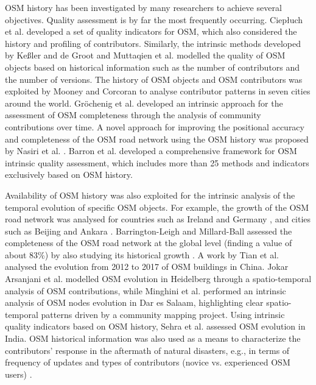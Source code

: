 \documentclass{Configuration_Files/PoliMi3i_thesis}
\begin{document}
OSM history has been investigated by many researchers to achieve several objectives. Quality assessment is by far the most frequently occurring. Ciepłuch et al. \cite{ciepluchBuildingGenericQuality2011} developed a set of quality indicators for OSM, which also considered the history and profiling of contributors. Similarly, the intrinsic methods developed by Keßler and de Groot \cite{kesslerTrustProxyMeasure2013} and Muttaqien et al. \cite{muttaqienModelingAggregatedExpertise2018} modelled the quality of OSM objects based on historical information such as the number of contributors and the number of versions. The history of OSM objects and OSM contributors was exploited by Mooney and Corcoran \cite{mooneyAnalysisInteractionCoediting2014} to analyse contributor patterns in seven cities around the world. Gröchenig et al. \cite{grochenigEstimatingCompletenessVGI2014} developed an intrinsic approach for the assessment of OSM completeness through the analysis of community contributions over time. A novel approach for improving the positional accuracy and completeness of the OSM road network using the OSM history was proposed by Nasiri et al. \cite{nasiriImprovingQualityCitizen2018}. Barron et al. \cite{barronComprehensiveFrameworkIntrinsic2014} developed a comprehensive framework for OSM intrinsic quality assessment, which includes more than 25 methods and indicators exclusively based on OSM history. 

Availability of OSM history was also exploited for the intrinsic analysis of the temporal evolution of specific OSM objects. For example, the growth of the OSM road network was analysed for countries such as Ireland \cite{corcoranAnalysingGrowthOpenStreetMap2013} and Germany \cite{neisStreetNetworkEvolution2011}, and cities such as Beijing \cite{zhaoStatisticalAnalysisEvolution2015} and Ankara \cite{hacarAnalyzingOpenStreetMapRoad2018}.
Barrington-Leigh and Millard-Ball assessed the completeness of the OSM road network at the global level (finding a value of about 83\%) by also studying its historical growth \cite{barrington-leighWorldUsergeneratedRoad2017}. A work by Tian et al. \cite{tianAnalysisEvolutionCompleteness2019} analysed the evolution from 2012 to 2017 of OSM buildings in China. Jokar Arsanjani et al. \cite{jokararsanjaniEmergenceEvolutionOpenStreetMap2015} modelled OSM evolution in Heidelberg through a spatio-temporal analysis of OSM contributions, while Minghini et al. \cite{minghiniOpenSourceApproach2018} performed an intrinsic analysis of OSM nodes evolution in Dar es Salaam, highlighting clear spatio-temporal patterns driven by a community mapping project. Using intrinsic quality indicators based on OSM history, Sehra et al. \cite{sehraUsingLatentSemantic2017} assessed OSM evolution in India. OSM historical information was also used as a means to characterize the contributors' response in the aftermath of natural disasters, e.g., in terms of frequency of updates and types of contributors (novice vs. experienced OSM users) \cite{dittusMassParticipationEmergency2017, minghiniCollaborativeMappingResponse2017, auerUsingPotentialOpenStreetMap2018}.
\end{document}
